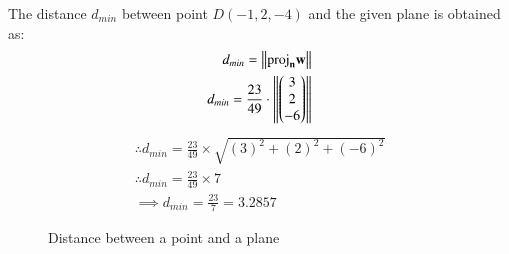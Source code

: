 \documentclass[journal,12pt,twocolumn]{IEEEtran}
\begin{document}
The distance $d_{min}$ between point $D(-1, 2, -4)$ and the given plane  is obtained as:
\begin{align}
    d_{min}=\left\lVert\text{proj}_\mathbf{n}\mathbf{w}\right\rVert\\
    d_{min}=\frac{23}{49}\cdot\left\lVert\begin{pmatrix}3\\2\\-6\end{pmatrix}\right\rVert
\end{align}
\begin{align}
    \therefore d_{min}=\frac{23}{49} \times \sqrt{(3)^2+(2)^2+(-6)^2}\\
    \therefore d_{min}=\frac{23}{49} \times 7\\
    \implies \boxed{d_{min}=\frac{23}{7}= 3.2857}
\end{align}
\begin{figure}[h!]
\centering
\resizebox{\columnwidth}{!}
    {
    
    }
    \caption{Distance between a point and a plane}
\end{figure}
\end{document}
